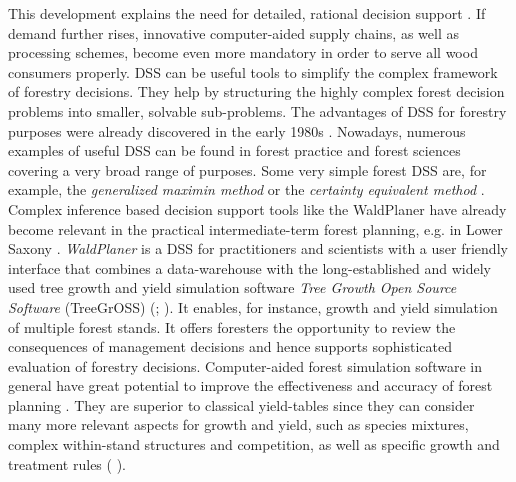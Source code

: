 This development explains the need for detailed, rational decision support \citep[p. 2]{hansen_2014}. If demand further rises, innovative computer-aided supply chains, as well as processing schemes, become even more mandatory in order to serve all wood consumers properly. DSS can be useful tools to simplify the complex framework of forestry decisions. They help by structuring the highly complex forest decision problems into smaller, solvable sub-problems. The advantages of DSS for forestry purposes were already discovered in the early 1980s \citep[p. 499]{reynolds_2008}. Nowadays, numerous examples of useful DSS can be found in forest practice and forest sciences covering a very broad range of purposes. Some very simple forest DSS are, for example, the \textit{generalized maximin method} or the \textit{certainty equivalent method} \citep[p. 25, 28]{kangas_2015}. Complex inference based decision support tools like the WaldPlaner \citep{hansen_2014} have already become relevant in the practical intermediate-term forest planning, e.g. in Lower Saxony \citep[p. 158]{bockmann_2004}. \textit{WaldPlaner} is a DSS for practitioners and scientists with a user friendly interface that combines a data-warehouse with the long-established and widely used tree growth and yield simulation software \textit{Tree Growth Open Source Software} (TreeGrOSS) (\citealp[p. 46]{hansen_2014}; \citealp{nagel_2009}). It enables, for instance, growth and yield simulation of multiple forest stands. It offers foresters the opportunity to review the consequences of management decisions and hence supports sophisticated evaluation of forestry decisions. Computer-aided forest simulation software in general have great potential to improve the effectiveness and accuracy of forest planning \citep[p. 210]{davis_2001}. They are superior to classical yield-tables since they can consider many more relevant aspects for growth and yield, such as species mixtures, complex within-stand structures and competition, as well as specific growth and treatment  rules (\citealp[p. 3]{hansen_2012} \citealp[p. 93]{muys_2010}).

